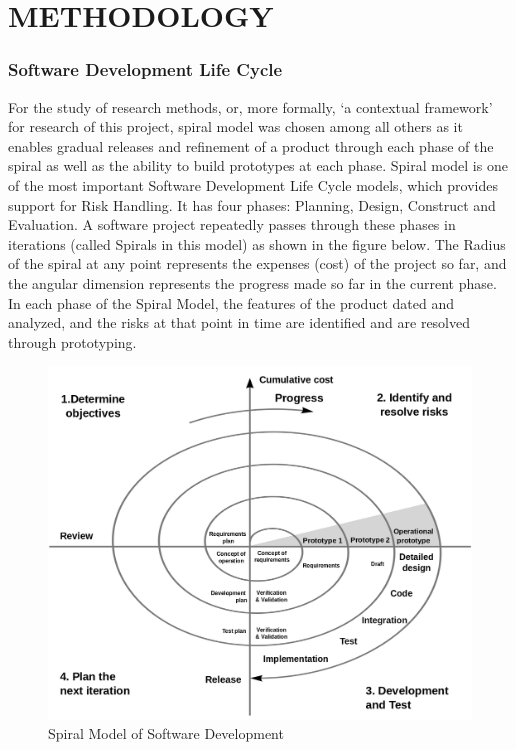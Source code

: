 
\section{METHODOLOGY}


\subsubsection{Software Development Life Cycle}
For the study of research methods, or, more formally, ‘a contextual framework' for
research of this project, spiral model was chosen among all others as it enables
gradual releases and refinement of a product through each phase of the spiral as
well as the ability to build prototypes at each phase. Spiral model is one of the most
important Software Development Life Cycle models, which provides support
for Risk Handling. It has four phases: Planning, Design, Construct and Evaluation.
A software project repeatedly passes through these phases in iterations (called
Spirals in this model) as shown in the figure below. The Radius of the spiral at any
point represents the expenses (cost) of the project so far, and the angular
dimension represents the progress made so far in the current phase. In each phase
of the Spiral Model, the features of the product dated and analyzed, and the risks
at that point in time are identified and are resolved through prototyping.
\begin{figure}[h]
    \centering
    \includegraphics[width=120mm]{spiral.png}
    \caption{Spiral Model of Software Development}
    \label{fig:Spiral Model}
\end{figure}
